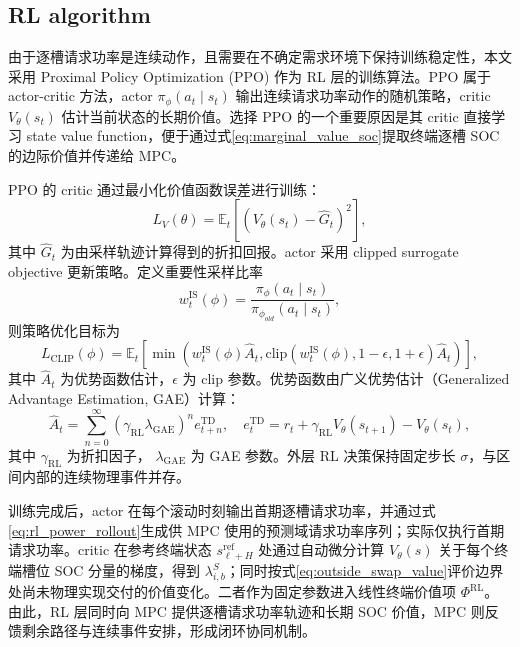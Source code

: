 \documentclass[12pt,a4paper,UTF8]{ctexart}
\begin{document}
\subsection{RL algorithm}

由于逐槽请求功率是连续动作，且需要在不确定需求环境下保持训练稳定性，本文采用 Proximal Policy Optimization (PPO) 作为 RL 层的训练算法。PPO 属于 actor-critic 方法，actor $\pi_{\phi}(a_t\mid s_t)$ 输出连续请求功率动作的随机策略，critic $V_{\theta}(s_t)$ 估计当前状态的长期价值。选择 PPO 的一个重要原因是其 critic 直接学习 state value function，便于通过式\eqref{eq:marginal_value_soc}提取终端逐槽 SOC 的边际价值并传递给 MPC。

PPO 的 critic 通过最小化价值函数误差进行训练：
\begin{equation}
L_V(\theta)=
\mathbb{E}_t\left[
\left(V_{\theta}(s_t)-\hat{G}_t\right)^2
\right],
\label{eq:value_loss}
\end{equation}
其中 $\hat{G}_t$ 为由采样轨迹计算得到的折扣回报。actor 采用 clipped surrogate objective 更新策略。定义重要性采样比率
\begin{equation}
w_t^{\mathrm{IS}}(\phi)=
\frac{\pi_{\phi}(a_t\mid s_t)}{\pi_{\phi_{old}}(a_t\mid s_t)},
\label{eq:ppo_ratio}
\end{equation}
则策略优化目标为
\begin{equation}
L_{\mathrm{CLIP}}(\phi)=
\mathbb{E}_t\left[
\min\left(
w_t^{\mathrm{IS}}(\phi)\hat{A}_t,
\mathrm{clip}(w_t^{\mathrm{IS}}(\phi),1-\epsilon,1+\epsilon)\hat{A}_t
\right)
\right],
\label{eq:ppo_clip}
\end{equation}
其中 $\hat{A}_t$ 为优势函数估计，$\epsilon$ 为 clip 参数。优势函数由广义优势估计（Generalized Advantage Estimation, GAE）计算：
\begin{equation}
\hat{A}_t=\sum_{n=0}^{\infty}
(\gamma_{\mathrm{RL}}\lambda_{\mathrm{GAE}})^n
e_{t+n}^{\mathrm{TD}},
\quad
e_t^{\mathrm{TD}}=r_t
+\gamma_{\mathrm{RL}}V_{\theta}(s_{t+1})-V_{\theta}(s_t),
\label{eq:gae}
\end{equation}
其中 $\gamma_{\mathrm{RL}}$ 为折扣因子，
$\lambda_{\mathrm{GAE}}$ 为 GAE 参数。外层 RL 决策保持固定步长 $\sigma$，与区间内部的连续物理事件并存。

训练完成后，actor 在每个滚动时刻输出首期逐槽请求功率，并通过式\eqref{eq:rl_power_rollout}生成供 MPC 使用的预测域请求功率序列；实际仅执行首期请求功率。critic 在参考终端状态 $s_{\ell+H}^{\mathrm{ref}}$ 处通过自动微分计算 $V_{\theta}(s)$ 关于每个终端槽位 SOC 分量的梯度，得到 $\lambda^S_{i,b}$；同时按式\eqref{eq:outside_swap_value}评价边界处尚未物理实现交付的价值变化。二者作为固定参数进入线性终端价值项 $\Phi^{\mathrm{RL}}$。由此，RL 层同时向 MPC 提供逐槽请求功率轨迹和长期 SOC 价值，MPC 则反馈剩余路径与连续事件安排，形成闭环协同机制。
\end{document}

